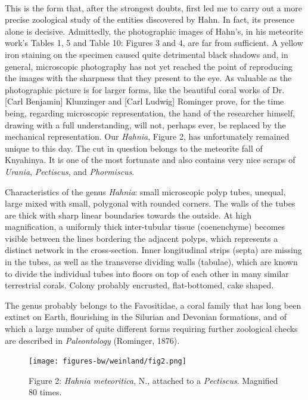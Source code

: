 \documentclass[a4paper, 12pt, oneside]{article}
\begin{document}
\paragraph*{}
This is the form that, after the strongest doubts, first led me to carry out a more precise zoological study of the entities discovered by Hahn. In fact, its presence alone is decisive. Admittedly, the photographic images of Hahn's, in his meteorite work's Tables 1, 5 and Table 10: Figures 3 and 4, are far from sufficient. A yellow iron staining on the specimen caused quite detrimental black shadows and, in general, microscopic photography has not yet reached the point of reproducing the images with the sharpness that they present to the eye. As valuable as the photographic picture is for larger forms, like the beautiful coral works of Dr. [Carl Benjamin] Klunzinger and [Carl Ludwig] Rominger prove, for the time being, regarding microscopic representation, the hand of the researcher himself, drawing with a full understanding, will not, perhaps ever, be replaced by the mechanical representation. Our \emph{Hahnia}, Figure 2, has unfortunately remained unique to this day. The cut in question belongs to the meteorite fall of Knyahinya. It is one of the most fortunate and also contains very nice scraps of \emph{Urania}, \emph{Pectiscus}, and \emph{Phormiscus}.

Characteristics of the genus \emph{Hahnia}: small microscopic polyp tubes, unequal, large mixed with small, polygonal with rounded corners. The walls of the tubes are thick with sharp linear boundaries towards the outside. At high magnification, a uniformly thick inter-tubular tissue (coenenchyme) becomes visible between the lines bordering the adjacent polyps, which represents a distinct network in the cross-section. Inner longitudinal strips (septa) are missing in the tubes, as well as the transverse dividing walls (tabulae), which are known to divide the individual tubes into floors on top of each other in many similar terrestrial corals. Colony probably encrusted, flat-bottomed, cake shaped.

The genus probably belongs to the Favositidae, a coral family that has long been extinct on Earth, flourishing in the Silurian and Devonian formations, and of which a large number of quite different forms requiring further zoological checks are described in \emph{Paleontology} (Rominger, 1876).
\begin{figure}[H]
\centering
\texttt{[image: figures-bw/weinland/fig2.png]}
\caption{Figure 2: \emph{Hahnia meteoritica}, N., attached to a \emph{Pectiscus}. Magnified 80 times.}
\end{figure}
\end{document}
